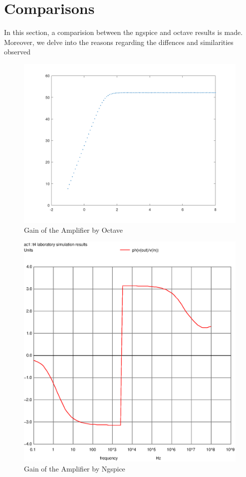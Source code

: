 \section{Comparisons}
\label{sec:comparsisons}

In this section, a comparision between the ngspice and octave results is made. Moreover, we delve into the reasons regarding the diffences and similarities observed\\

\FloatBarrier
\begin{figure}
  \includegraphics{GAINVERDADEIRO.png}
  \caption{Gain of the Amplifier by Octave}
  \label{}
\end{figure}
\FloatBarrier

\FloatBarrier
\begin{figure}
  \includegraphics{gain2.ps}
  \caption{Gain of the Amplifier by Ngspice}
  \label{}
\end{figure}
\FloatBarrier


